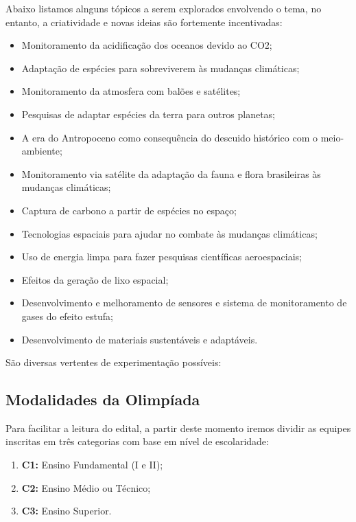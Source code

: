     \par Abaixo listamos alnguns tópicos a serem explorados envolvendo o tema, no entanto, a criatividade
    e novas ideias são fortemente incentivadas:

    \begin{itemize}
        \item Monitoramento da acidificação dos oceanos devido ao CO2;
        \item Adaptação de espécies para sobreviverem às mudanças climáticas;
        \item Monitoramento da atmosfera com balões e satélites;
        \item Pesquisas de adaptar espécies da terra para outros planetas;
        \item A era do Antropoceno como consequência do descuido histórico com o meio-ambiente;
        \item Monitoramento via satélite da adaptação da fauna e flora brasileiras às mudanças climáticas;
        \item Captura de carbono a partir de espécies no espaço;
        \item Tecnologias espaciais para ajudar no combate às mudanças climáticas;
        \item Uso de energia limpa para fazer pesquisas científicas aeroespaciais;
        \item Efeitos da geração de lixo espacial;
        \item Desenvolvimento e melhoramento de sensores e sistema de monitoramento de gases do efeito estufa;
        \item Desenvolvimento de materiais sustentáveis e adaptáveis.
    \end{itemize}

    \par São diversas vertentes de experimentação possíveis: 

    
    \subsection{Modalidades da Olimpíada} \label{sec:modalidades}
        Para facilitar a leitura do edital, a partir deste momento iremos dividir as equipes inscritas em três categorias com base em nível de escolaridade:
        \begin{enumerate}
            \item \textbf{C1:} Ensino Fundamental (I e II);
            \item \textbf{C2:} Ensino Médio ou Técnico;
            \item \textbf{C3:} Ensino Superior.
        \end{enumerate}

